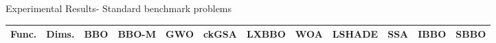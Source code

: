 \documentclass [9pt,times] {beamer}
\begin{document}
\begin{frame}[plain]{Experimental Results- Standard benchmark problems}
       \fontsize{8pt}{10pt}\selectfont
%  

        \begin{center}
       \fontsize{4.3pt}{7.3pt}\selectfont
\begin{tabular}{p{0.08in} | p{0.09in} | p{0.25in} |  p{0.23in} |  p{0.25in}|  p{0.25in} |  p{0.25in} | p{0.25in} |  p{0.25in} | p{0.25in} |  p{0.25in} |  p{0.25in}}
    \hline
\hline\textbf{Func.} 	&	 \textbf{Dims.} 	&	 \textbf{BBO} 	&	 \textbf{BBO-M} &	 \textbf{GWO} 	&	 \textbf{ckGSA} 	&	 \textbf{LXBBO} 	&	 \textbf{WOA} 	&	\textbf{LSHADE} 	&	 \textbf{SSA} 	&	 \textbf{IBBO} 	&	\textbf{SBBO} \\
\hline
																							

\end{tabular}
\end{center}
\end{frame}
\end{document}
